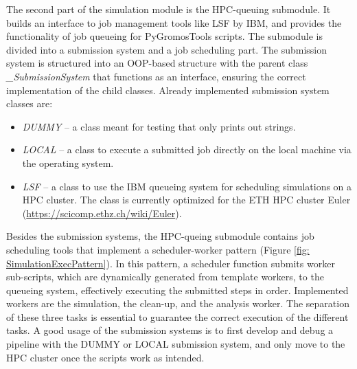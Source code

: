 The second part of the simulation module is the HPC-queuing submodule. It builds an interface to job management tools like LSF by IBM, and provides the functionality of job queueing for PyGromosTools scripts. The submodule is divided into a submission system and a job scheduling part. The submission system is structured into an OOP-based structure with the parent class \textit{\_SubmissionSystem} that functions as an interface, ensuring the correct implementation of the child classes. Already implemented submission system classes are: 
\begin{itemize}
\item \textit{DUMMY} -- a class meant for testing that only prints out strings. 
\item \textit{LOCAL} -- a class to execute a submitted job directly on the local machine via the operating system.
\item \textit{LSF} -- a class to use the IBM queueing system for scheduling simulations on a HPC cluster. The class is currently optimized for the ETH HPC cluster Euler (\url{https://scicomp.ethz.ch/wiki/Euler}).
\end{itemize}
Besides the submission systems, the HPC-queing submodule contains job scheduling tools that implement a scheduler-worker pattern (Figure \ref{fig: SimulationExecPattern}). In this pattern, a scheduler function submits worker sub-scripts, which are dynamically generated from template workers, to the queueing system, effectively executing the submitted steps in order. Implemented workers are the simulation, the clean-up, and the analysis worker. The separation of these three tasks is essential to guarantee the correct execution of the different tasks.
%
A good usage of the submission systems is to first develop and debug a pipeline with the DUMMY or LOCAL submission system, and only move to the HPC cluster once the scripts work as intended. %

